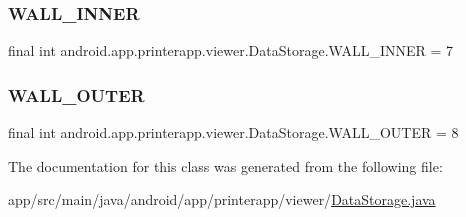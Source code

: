 \subsubsection{\texorpdfstring{W\+A\+L\+L\+\_\+\+I\+N\+N\+ER}{WALL\_INNER}}
{\footnotesize\ttfamily final int android.\+app.\+printerapp.\+viewer.\+Data\+Storage.\+W\+A\+L\+L\+\_\+\+I\+N\+N\+ER = 7\hspace{0.3cm}{\ttfamily [static]}}

\mbox{\label{classandroid_1_1app_1_1printerapp_1_1viewer_1_1_data_storage_ac301c6a3bbf102afbf0610ba7d051034}} 
\subsubsection{\texorpdfstring{W\+A\+L\+L\+\_\+\+O\+U\+T\+ER}{WALL\_OUTER}}
{\footnotesize\ttfamily final int android.\+app.\+printerapp.\+viewer.\+Data\+Storage.\+W\+A\+L\+L\+\_\+\+O\+U\+T\+ER = 8\hspace{0.3cm}{\ttfamily [static]}}



The documentation for this class was generated from the following file\+:\begin{DoxyCompactItemize}
\item 
app/src/main/java/android/app/printerapp/viewer/\hyperlink{_data_storage_8java}{Data\+Storage.\+java}\end{DoxyCompactItemize}
